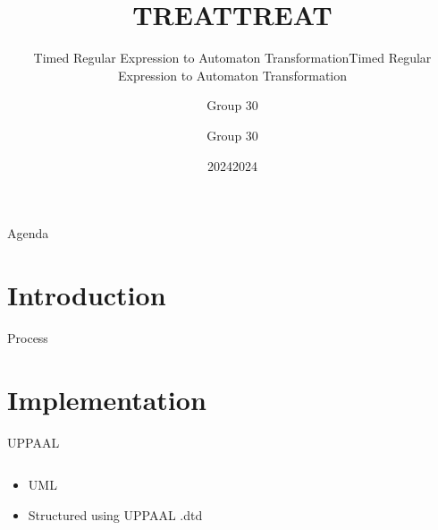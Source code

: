 \documentclass{beamer}
\title{TREAT}
\subtitle{Timed Regular Expression to Automaton Transformation}
\author{Group 30}
\institute{Aalborg Universitet}
\date{2024}
\title{TREAT}
\subtitle{Timed Regular Expression to Automaton Transformation}
\author{Group 30}
\institute{Aalborg Universitet}
\date{2024}
\begin{document}
\frame{\titlepage}

\begin{frame}{Agenda}
    \tableofcontents
\end{frame}

\section{Introduction} %
\begin{frame} {Process}

\end{frame}

\section{Implementation}
\begin{frame}{UPPAAL}
    \begin{columns}
        \begin{column}{0.4\textwidth}
            \begin{itemize}
                \item UML
                \item Structured using UPPAAL .dtd
            \end{itemize}
        \end{column}
        \begin{column}{0.6\textwidth}
            \scalebox{0.8}{
                
            }
        \end{column}
    \end{columns}

\end{frame}
\end{document}
